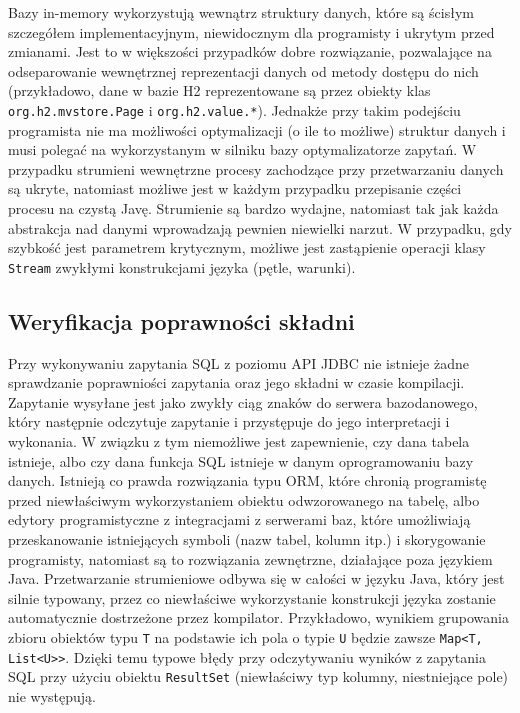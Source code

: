 \documentclass[12pt]{extarticle}
\begin{document}
    Bazy in-memory wykorzystują wewnątrz struktury danych, które są ścisłym szczegółem implementacyjnym, niewidocznym dla programisty i ukrytym przed zmianami. Jest to w większości przypadków dobre rozwiązanie, pozwalające na odseparowanie wewnętrznej reprezentacji danych od metody dostępu do nich (przykładowo, dane w bazie H2 reprezentowane są przez obiekty klas \texttt{org.h2.mvstore.Page} i \texttt{org.h2.value.*}). Jednakże przy takim podejściu programista nie ma możliwości optymalizacji (o ile to możliwe) struktur danych i musi polegać na wykorzystanym w silniku bazy optymalizatorze zapytań. W przypadku strumieni wewnętrzne procesy zachodzące przy przetwarzaniu danych są ukryte, natomiast możliwe jest w każdym przypadku przepisanie części procesu na czystą Javę. Strumienie są bardzo wydajne, natomiast tak jak każda abstrakcja nad danymi wprowadzają pewnien niewielki narzut. W przypadku, gdy szybkość jest parametrem krytycznym, możliwe jest zastąpienie operacji klasy \texttt{Stream} zwykłymi konstrukcjami języka (pętle, warunki). 

\subsection{Weryfikacja poprawności składni}

    Przy wykonywaniu zapytania SQL z poziomu API JDBC nie istnieje żadne sprawdzanie poprawniości zapytania oraz jego składni w czasie kompilacji. Zapytanie wysyłane jest jako zwykły ciąg znaków do serwera bazodanowego, który następnie odczytuje zapytanie i przystępuje do jego interpretacji i wykonania. W związku z tym niemożliwe jest zapewnienie, czy dana tabela istnieje, albo czy dana funkcja SQL istnieje w danym oprogramowaniu bazy danych. Istnieją co prawda rozwiązania typu ORM, które chronią programistę przed niewłaściwym wykorzystaniem obiektu odwzorowanego na tabelę, albo edytory programistyczne z integracjami z serwerami baz, które umożliwiają przeskanowanie istniejących symboli (nazw tabel, kolumn itp.) i skorygowanie programisty, natomiast są to rozwiązania zewnętrzne, działające poza językiem Java. Przetwarzanie strumieniowe odbywa się w całości w języku Java, który jest silnie typowany, przez co niewłaściwe wykorzystanie konstrukcji języka zostanie automatycznie dostrzeżone przez kompilator. Przykładowo, wynikiem grupowania zbioru obiektów typu \texttt{T} na podstawie ich pola o typie \texttt{U} będzie zawsze \texttt{Map<T, List<U>}\texttt{>}. Dzięki temu typowe błędy przy odczytywaniu wyników z zapytania SQL przy użyciu obiektu \texttt{ResultSet} (niewłaściwy typ kolumny, niestniejące pole) nie występują.
\end{document}
